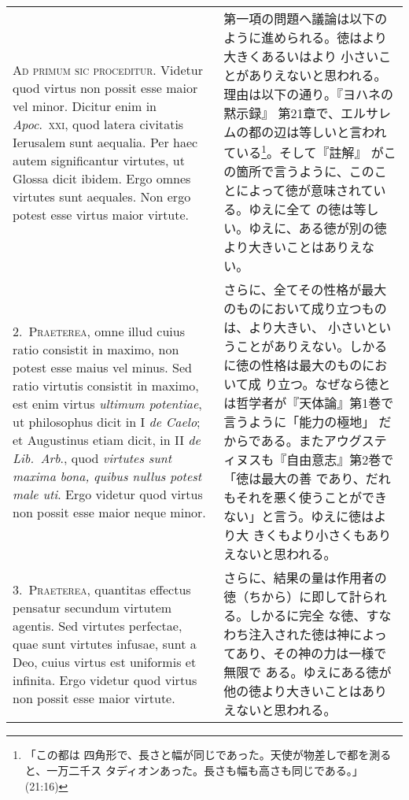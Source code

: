 \documentclass[10pt]{jsarticle}
\begin{document}
\begin{longtable}{p{21em}p{21em}}

 {\scshape Ad primum sic proceditur}. Videtur quod virtus non possit
 esse maior vel minor. Dicitur enim in {\itshape Apoc}.~{\scshape xxi}, quod latera
 civitatis Ierusalem sunt aequalia. Per haec autem significantur
 virtutes, ut Glossa dicit ibidem. Ergo omnes virtutes sunt
 aequales. Non ergo potest esse virtus maior virtute.
 
&

第一項の問題へ議論は以下のように進められる。徳はより大きくあるいはより
小さいことがありえないと思われる。理由は以下の通り。『ヨハネの黙示録』
第21章で、エルサレムの都の辺は等しいと言われている\footnote{「この都は
四角形で、長さと幅が同じであった。天使が物差しで都を測ると、一万二千ス
タディオンあった。長さも幅も高さも同じである。」(21:16)}。そして『註解』
がこの箇所で言うように、このことによって徳が意味されている。ゆえに全て
の徳は等しい。ゆえに、ある徳が別の徳より大きいことはありえない。

\\



2.~{\scshape Praeterea}, omne illud cuius ratio consistit in maximo,
non potest esse maius vel minus. Sed ratio virtutis consistit in
maximo, est enim virtus {\itshape ultimum potentiae}, ut philosophus
dicit in I {\itshape de Caelo}; et Augustinus etiam dicit, in II
{\itshape de Lib.~Arb}., quod {\itshape virtutes sunt maxima bona,
quibus nullus potest male uti}. Ergo videtur quod virtus non possit
esse maior neque minor.

 
&

 さらに、全てその性格が最大のものにおいて成り立つものは、より大きい、
 小さいということがありえない。しかるに徳の性格は最大のものにおいて成
 り立つ。なぜなら徳とは哲学者が『天体論』第1巻で言うように「能力の極地」
 だからである。またアウグスティヌスも『自由意志』第2巻で「徳は最大の善
 であり、だれもそれを悪く使うことができない」と言う。ゆえに徳はより大
 きくもより小さくもありえないと思われる。

\\

 3.~{\scshape Praeterea}, quantitas effectus pensatur secundum
 virtutem agentis. Sed virtutes perfectae, quae sunt virtutes infusae,
 sunt a Deo, cuius virtus est uniformis et infinita. Ergo videtur quod
 virtus non possit esse maior virtute.
 
&

 さらに、結果の量は作用者の徳（ちから）に即して計られる。しかるに完全
 な徳、すなわち注入された徳は神によってあり、その神の力は一様で無限で
 ある。ゆえにある徳が他の徳より大きいことはありえないと思われる。
 


\end{longtable}
\end{document}
